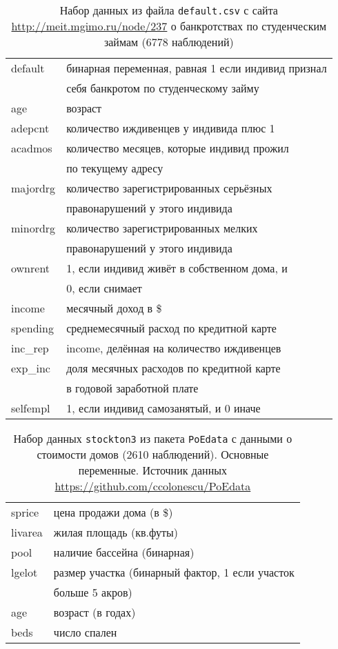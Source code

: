 \documentclass[12pt]{article}
\theoremstyle{remark}
\begin{document}
\begin{table}
	\caption{Набор данных из файла \texttt{default.csv}
	с сайта \url{http://meit.mgimo.ru/node/237} о 
	банкротствах по студенческим займам (6778 наблюдений)} 
	\label{defaultDataset}
	\begin{tabular}{l|l}\hline
	default & бинарная переменная, равная 1 если индивид признал \\
	& себя банкротом по студенческому займу \\
	age & возраст \\
	adepcnt & количество иждивенцев у индивида плюс 1 \\
	acadmos & количество месяцев, которые индивид прожил \\ 
	& по текущему адресу \\
	majordrg & количество зарегистрированных серьёзных \\
	& правонарушений у этого индивида \\
	minordrg &   количество зарегистрированных мелких \\ 
	& правонарушений у этого индивида \\
	ownrent &1, если индивид живёт в собственном дома, и  \\
	& 0, если снимает\\
	income & месячный доход в \$ \\
	spending & среднемесячный расход по кредитной карте \\
	inc\_rep & income, делённая на количество иждивенцев \\
	exp\_inc & доля месячных расходов по кредитной карте \\
	&  в годовой заработной плате \\
	selfempl & 1, если индивид самозанятый, и 0 иначе \\
	\hline
	\end{tabular}
\end{table}

\begin{table}
	\caption{Набор данных \texttt{stockton3}
	из пакета \texttt{PoEdata}
	 с данными о стоимости домов (2610  наблюдений).  Основные переменные.
	Источник данных \url{https://github.com/ccolonescu/PoEdata} }
	\label{stockton3}
	\begin{tabular}{l|l}\hline
	sprice & цена продажи дома  (в \$) \\
	livarea & жилая площадь  (кв.футы) \\
	pool & наличие бассейна (бинарная) \\
	lgelot & размер участка  (бинарный фактор, 1 если участок \\
	& больше 5 акров) \\
	age & возраст (в годах)  \\
	beds & число спален \\
	\hline
	\end{tabular}
\end{table}
\end{document}
